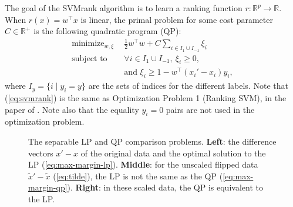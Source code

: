 \documentclass{article}
\newcommand{\RR}{\mathbb R}
\DeclareMathOperator*{\minimize}{minimize}
\begin{document}
The goal of the SVMrank algorithm is to learn a ranking function
$r:\RR^p \rightarrow \RR$. When $r(x)=w^\intercal x$ is linear, the
primal problem for some cost parameter $C\in\RR^+$ is the following
quadratic program (QP):
\begin{equation}
  \begin{aligned}
    \minimize_{w, \xi}\ \  & \frac 1 2 w^\intercal w 
    + C \sum_{i\in I_1\cup I_{-1}} \xi_i \\
    \text{subject to}\ \  & 
    \forall i\in I_1\cup I_{-1},\ \xi_i \geq 0,\\
&    \text{and }\xi_i \geq 1-w^\intercal(x_i'-x_i)y_i,
  \end{aligned}
  \label{eq:svmrank}
\end{equation}
where $I_y=\{i\mid y_i=y\}$ are the sets of indices for the different
labels. Note that (\ref{eq:svmrank}) is the same as Optimization
Problem 1 (Ranking SVM), in the paper of \citet{ranksvm}. Note also
that the equality $y_i=0$ pairs are not used in the optimization
problem.

\begin{figure*}[b!]
  \centering
  
  \vskip -1cm
  \caption{The separable LP and QP comparison problems. \textbf{Left}:
    the difference vectors $x'-x$ of the original data and the optimal
    solution to the LP (\ref{eq:max-margin-lp}). \textbf{Middle}: for
    the unscaled flipped data $\tilde x'-\tilde x$ (\ref{eq:tilde}),
    the LP is not the same as the QP
    (\ref{eq:max-margin-qp}). \textbf{Right}: in these scaled
    data, the QP is equivalent to the LP.}
  \label{fig:hard-margin}
\end{figure*}
\end{document}

